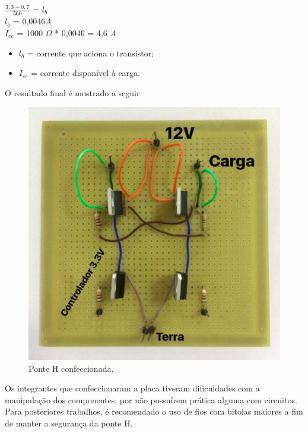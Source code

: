 \begin{center}
	
	$\frac{3,3 - 0,7}{560}$ = $l_{b}$\\
	$l_{b}$ = 0,0046\textit{A}\\
	$I_{ce}$ = 1000 $\Omega$ * 0,0046 = 4,6 \textit{A}
	
\end{center}

\begin{itemize}

	\item $l_{b}$ = corrente que aciona o transistor;
	\item $I_{ce}$ = corrente disponível à carga.
	
\end{itemize}

O resultado final é mostrado a seguir:

\begin{figure}[H]
	\centering
	\includegraphics[width=13cm]{figuras/ponteHpronta.png}
	\caption{Ponte H confeccionada.}
	\label{ponte H pronta}
\end{figure}

Os integrantes que confeccionaram a placa tiveram dificuldades com a manipulação dos componentes, por não possuírem prática alguma com circuitos. Para posteriores trabalhos, é recomendado o uso de fios com bitolas maiores a fim de manter a segurança da ponte H.
